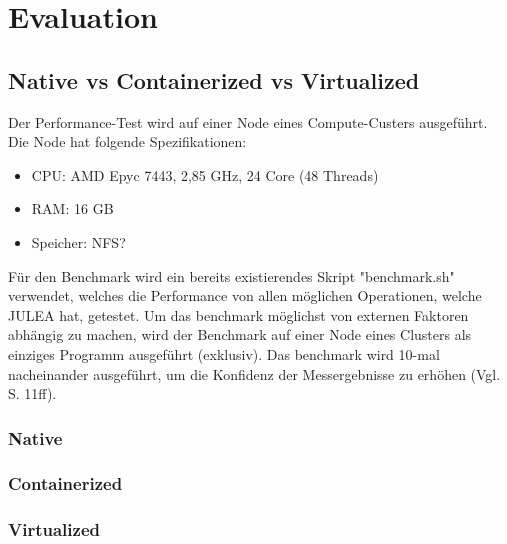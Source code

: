 \chapter{Evaluation}

\section{Native vs Containerized vs Virtualized}

Der Performance-Test wird auf einer Node eines Compute-Custers ausgeführt. Die Node hat folgende Spezifikationen:

\begin{itemize}
    \item CPU: AMD Epyc 7443, 2,85 GHz, 24 Core (48 Threads)
    \item RAM: 16 GB
    \item Speicher: NFS?
\end{itemize}

Für den Benchmark wird ein bereits existierendes Skript "benchmark.sh" verwendet, welches die Performance von allen möglichen Operationen, welche JULEA hat, getestet. Um das benchmark möglichst von externen Faktoren abhängig zu machen, wird der Benchmark auf einer Node eines Clusters als einziges Programm ausgeführt (exklusiv). Das benchmark wird 10-mal nacheinander ausgeführt, um die Konfidenz der Messergebnisse zu erhöhen (Vgl. \cite{kaliberaRigorousBenchmarkingReasonable2013} S. 11ff). 

\subsection{Native}



\subsection{Containerized}

\subsection{Virtualized}





